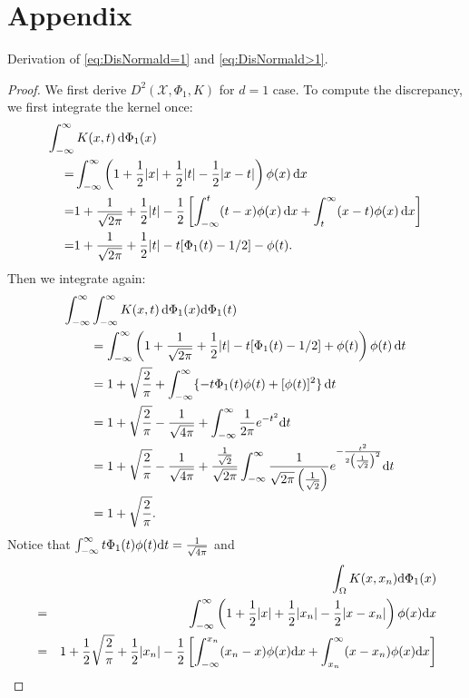 \documentclass[graybox]{svmult}
\newcommand{\dif}{{\rm d}}
\newcommand{\Xdes}{\mathcal{X}}
\begin{document}
\section*{Appendix}
Derivation of \eqref{eq:DisNormald=1} and \eqref{eq:DisNormald>1}. 
\begin{proof}
We first derive $D^2(\Xdes,\Phi_1,K)$ for $d=1$ case. 
To compute the discrepancy, we first integrate the kernel once:
\begin{align*}
\MoveEqLeft{\int_{-\infty}^\infty K(x,t) \, \dif \Phi_1(x)}\\
=&\int_{-\infty}^{\infty} \left(1+\frac{1}{2}|x|+\frac{1}{2}|t|-\frac{1}{2}|x-t|\right)\phi(x) \, \dif x\\
=& 1+ \frac{1}{\sqrt{2\pi}} + \frac{1}{2}|t|-\frac{1}{2}\left[\int_{-\infty}^{t}(t-x)\phi(x) \, \dif x+\int_{t}^{\infty} (x-t)\phi(x) \, \dif x\right]\\
=& 1+ \frac{1}{\sqrt{2\pi}} + \frac{1}{2}|t| - t [\Phi_1(t)-1/2] - \phi(t) .
\end{align*}
Then we integrate again:
\begin{align*}
\MoveEqLeft{\int_{-\infty}^\infty \int_{-\infty}^\infty K(x,t) \, \dif \Phi_1(x) \dif \Phi_1(t)}\\
& =  \int_{-\infty}^{\infty} \left( 1+\frac{1}{\sqrt{2\pi}} + \frac{1}{2}|t| - t [\Phi_1(t)-1/2] + \phi(t)\right)\phi(t) \, \dif t\\
&= 1+ \sqrt{\frac{2}{\pi}} + \int_{-\infty}^{\infty} \{ - t \Phi_1(t)\phi(t)  +  [\phi(t)]^2 \} \, \dif t\\
&= 1+\sqrt{\frac{2}{\pi}}-\frac{1}{\sqrt{4\pi}}+\int_{-\infty}^{\infty}\frac{1}{2\pi}e^{-t^2}\dif t\\
&= 1+\sqrt{\frac{2}{\pi}}-\frac{1}{\sqrt{4\pi}}+\frac{\frac{1}{\sqrt{2}}}{\sqrt{2\pi}}\int_{-\infty}^{\infty}\frac{1}{\sqrt{2\pi}\left(\frac{1}{\sqrt{2}}\right)}e^{-\frac{t^2}{2\left(\frac{1}{\sqrt{2}}\right)^2}}\dif t\\
&=1+\sqrt{\frac{2}{\pi}}. 
\end{align*}
Notice that $\int_{-\infty}^{\infty} t\Phi_1(t)\phi(t)\dif t = \frac{1}{\sqrt{4\pi}}$ and 
\begin{eqnarray*}
&&\int_{\Omega}K(x,x_n)\dif \Phi_1(x)\\
&=& \int_{-\infty}^{\infty} \left(1+\frac{1}{2}|x|+\frac{1}{2}|x_n|-\frac{1}{2}|x-x_n|\right)\phi(x)\dif x\\
&=& 1+\frac{1}{2}\sqrt{\frac{2}{\pi}}+\frac{1}{2}|x_n|-\frac{1}{2}\left[\int_{-\infty}^{x_n}(x_n-x)\phi(x)\dif x+\int_{x_n}^{\infty} (x-x_n)\phi(x)\dif x\right]\\

\end{eqnarray*}
\end{proof}
\end{document}
